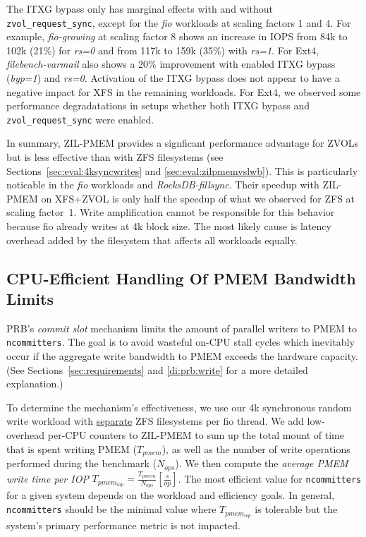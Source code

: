 \documentclass[12pt,a4paper,twoside]{book}
\begin{document}
The ITXG bypass only has marginal effects with and without \lstinline{zvol_request_sync}, except for the \textit{fio} workloads at scaling factors 1 and 4.
For example, \textit{fio-growing} at scaling factor 8 shows an increase in IOPS from 84k to 102k (21\%) for \textit{rs=0} and from 117k to 159k (35\%) with \textit{rs=1}.
For Ext4, \textit{filebench-varmail} also shows a 20\% improvement with enabled ITXG bypass (\textit{byp=1}) and \textit{rs=0}.
Activation of the ITXG bypass does not appear to have a negative impact for XFS in the remaining workloads.
For Ext4, we observed some performance degradatations in setups whether both ITXG bypass and \lstinline{zvol_request_sync} were enabled.

In summary, ZIL-PMEM provides a signficant performance advantage for ZVOLs but is less effective than with ZFS filesystems (see Sections~\ref{sec:eval:4ksyncwrites} and \ref{sec:eval:zilpmemvslwb}).
This is particularly noticable in the \textit{fio} workloads and \textit{RocksDB-fillsync}.
Their speedup with ZIL-PMEM on XFS+ZVOL is only half the speedup of what we observed for ZFS at scaling factor~1.
Write amplification cannot be responsible for this behavior because fio already writes at 4k block size.
The most likely cause is latency overhead added by the filesystem that affects all workloads equally.

\subsection{CPU-Efficient Handling Of PMEM Bandwidth Limits}\label{sec:eval:ncommitters_scalability}

PRB's \textit{commit slot} mechanism limits the amount of parallel writers to PMEM to \lstinline{ncommitters}.
The goal is to avoid wasteful on-CPU stall cycles which inevitably occur if the aggregate write bandwidth to PMEM exceeds the hardware capacity.
(See Sections~\ref{sec:requirements} and \ref{di:prb:write} for a more detailed explanation.)

To determine the mechanism's effectiveness, we use our 4k synchronous random write workload with \underline{separate} ZFS filesystems per fio thread.
We add low-overhead per-CPU counters to ZIL-PMEM to sum up the total mount of time that is spent writing PMEM ($T_{pmem}$), as well as the number of write operations performed during the benchmark ($N_{ops}$).
We then compute the \textit{average PMEM write time per IOP} $T_{pmem_{iop}} = \frac{T_{pmem}}{N_{ops}} [\frac{s}{op}]$.
The most efficient value for \lstinline{ncommitters} for a given system depends on the workload and efficiency goals.
In general, \lstinline{ncommitters} should be the minimal value where $T_{pmem_{iop}}$ is tolerable but the system's primary performance metric is not impacted.
\end{document}
